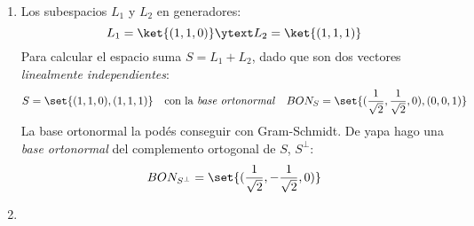 \begin{enumerate}[label=(\alph*)]
  \item Los subespacios $L_1$ y $L_2$ en generadores:
        $$
          L_1 = \ket{(1,1,0)}
          \ytext
          L_2 = \ket{(1,1,1)}
        $$
        Para calcular el espacio suma $S = L_1 + L_2$, dado que son dos vectores \textit{linealmente independientes}:
        $$
          S = \set{(1,1,0), (1,1,1)}
          \quad
          \text{con la \textit{base ortonormal}}
          \quad
          BON_S = \set{(\frac{1}{\sqrt{2}}, \frac{1}{\sqrt{2}}, 0), (0,0,1)}
        $$
        La base ortonormal la podés conseguir con Gram-Schmidt. De yapa hago una \textit{base ortonormal} del complemento ortogonal de $S$, $S^\perp$:
        $$
          BON_{S^\perp} = \set{(\frac{1}{\sqrt{2}}, -\frac{1}{\sqrt{2}}, 0)}
        $$

  \item


\end{enumerate}
